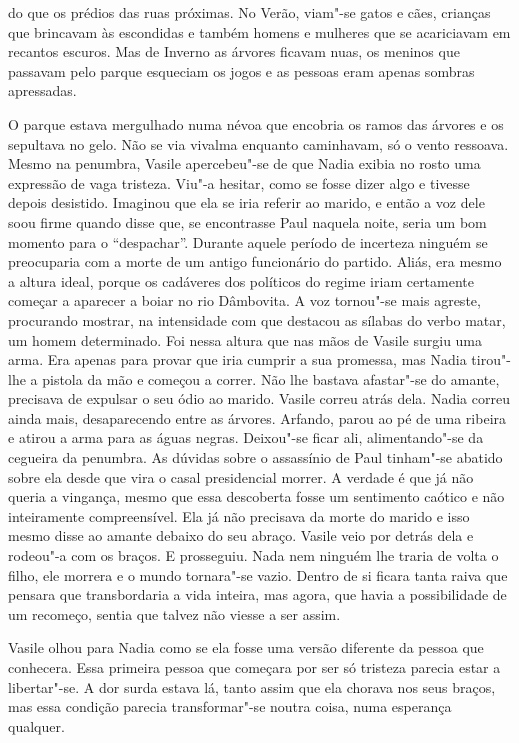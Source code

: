 do que os prédios das ruas próximas. No Verão, viam"-se gatos e cães,
crianças que brincavam às escondidas e também homens e mulheres que se
acariciavam em recantos escuros. Mas de Inverno as árvores ficavam nuas,
os meninos que passavam pelo parque esqueciam os jogos e as pessoas eram apenas
sombras apressadas.

O parque estava mergulhado numa névoa que encobria os ramos das árvores
e os sepultava no gelo. Não se via vivalma enquanto caminhavam, só o
vento ressoava. Mesmo na penumbra, Vasile apercebeu"-se de que Nadia
exibia no rosto uma expressão de vaga tristeza. Viu"-a hesitar, como se
fosse dizer algo e tivesse depois desistido. Imaginou que ela se iria
referir ao marido, e então a voz dele soou firme quando disse que, se
encontrasse Paul naquela noite, seria um bom momento para o ``despachar''. Durante aquele período de incerteza ninguém se preocuparia com a
morte de um antigo funcionário do partido. Aliás, era mesmo a altura
ideal, porque os cadáveres dos políticos do regime iriam certamente
começar a aparecer a boiar no rio Dâmbovita. A voz tornou"-se mais
agreste, procurando mostrar, na intensidade com que destacou as
sílabas do verbo matar, um homem determinado. Foi nessa altura que nas
mãos de Vasile surgiu uma arma. Era apenas para provar que iria cumprir
a sua promessa, mas Nadia tirou"-lhe a pistola da mão e começou a
correr. Não lhe bastava afastar"-se do amante, precisava de expulsar o
seu ódio ao marido. Vasile correu atrás dela. Nadia correu ainda mais,
desaparecendo entre as árvores. Arfando, parou ao pé de uma ribeira e
atirou a arma para as águas negras. Deixou"-se ficar ali, alimentando"-se
da cegueira da penumbra. As dúvidas sobre o assassínio de Paul tinham"-se
abatido sobre ela desde que vira o casal presidencial morrer. A verdade
é que já não queria a vingança, mesmo que essa descoberta fosse um
sentimento
caótico e não inteiramente compreensível. Ela já não precisava da
morte do marido e isso mesmo disse ao amante debaixo do seu abraço.
Vasile veio por detrás dela e rodeou"-a com os braços. E prosseguiu. Nada
nem ninguém lhe traria de volta o filho, ele morrera e o mundo tornara"-se vazio. Dentro de si ficara tanta raiva que pensara que transbordaria
a vida inteira, mas agora, que havia a possibilidade de um recomeço,
sentia que talvez não viesse a ser assim.

Vasile olhou para Nadia como se ela fosse uma versão diferente da pessoa
que conhecera. Essa primeira pessoa que começara por ser só tristeza
parecia estar a libertar"-se. A dor surda estava lá, tanto assim que ela
chorava nos seus braços, mas essa condição parecia transformar"-se noutra
coisa, numa esperança qualquer.

